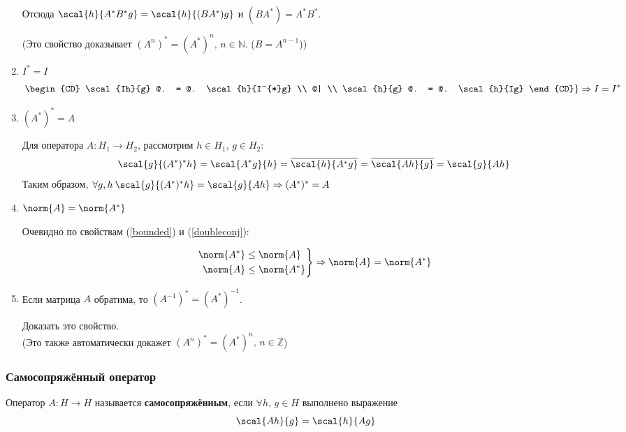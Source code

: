 \begin{enumerate}
		Отсюда $\scal{h}{A^{*}B^{*}g} = \scal{h}{(BA^{*})g}$ и $(BA^{*}) = A^{*}B^{*}$.
		
		{\Large(}Это свойство доказывает $(A^n)^{*} = (A^{*})^n,\, n \in \mathbb{N}$. ($B=A^{n-1}$){\Large)} \\
		
		\item $I^{*} = I$
		$$
		\left.
		\begin{CD}
			\scal{Ih}{g} @. = @. \scal{h}{I^{*}g} \\
				@| \\
			\scal{h}{g} @. = @. \scal{h}{Ig}
		\end{CD}
		\right\} \Rightarrow I = I^{*}
		$$
		
		\item $(A^{*})^{*} = A$ \label{doubleconj}
		
		Для оператора $A: H_1 \rightarrow H_2$, рассмотрим $h \in H_1$, $g \in H_2$:
		$$
			\scal{g}{(A^{*})^{*}h} = \scal{A^{*}g}{h} = \overline{\scal{h}{A^{*}g}} = 
			\overline{\scal{Ah}{g}} = \scal{g}{Ah}
		$$
		Таким образом, $\forall g,h \: \scal{g}{(A^{*})^{*}h} = \scal{g}{Ah} \Rightarrow (A^{*})^{*} = A$
		
		\item $\norm{A} = \norm{A^{*}}$
		
		Очевидно по свойствам (\ref{bounded}) и (\ref{doubleconj}):
		
		$$
		\left.
		\begin{aligned}
			\norm{A^{*}} &\leq \norm{A} \\
			\norm{A} &\leq \norm{A^{*}}
		\end{aligned}
		\right\}
		\Rightarrow \norm{A} = \norm{A^{*}}
		$$
		
		\item Если матрица $A$ обратима, то $(A^{-1})^{*} = (A^{*})^{-1}$.
		
		\exc Доказать это свойство. \\
		{\Large(}Это также автоматически докажет $(A^n)^{*} = (A^{*})^n,\, n \in \mathbb{Z}${\Large)}
	\end{enumerate}
	
	\subsubsection{Самосопряжённый оператор}
	
	\begin{defi}
		Оператор $A : H \rightarrow H$ называется \textbf{самосопряжённым}, если $\forall h,\, g \in H$ выполнено выражение
		$$\scal{Ah}{g} = \scal{h}{Ag}$$
	\end{defi}
	
